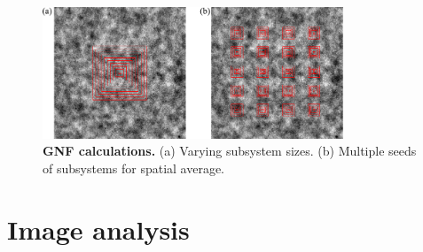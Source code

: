 \documentclass[twocolumn,aps,prx,amsmath,amssymb,longbibliography]{revtex4-2}
\begin{document}
\begin{figure}[!]
\begin{center}
\includegraphics[width=0.8\textwidth]{figures/GNF-calculation/v1.pdf}
\caption[GNF calculations]
{
\textbf{GNF calculations.}
(a) Varying subsystem sizes.
(b) Multiple seeds of subsystems for spatial average.
}
\label{GNF-calculation}
\end{center}
\end{figure}


\section{Image analysis}
\end{document}
